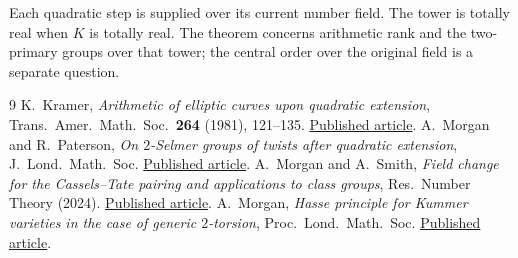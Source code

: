 \documentclass[11pt]{article}
\begin{document}
Each quadratic step is supplied over its current number field.
The tower is totally real when $K$ is totally real. The theorem
concerns arithmetic rank and the two-primary groups over that tower;
the central order over the original field is a separate question.

\begin{thebibliography}{9}
 K.~Kramer, \emph{Arithmetic of elliptic curves upon quadratic
extension}, Trans.\ Amer.\ Math.\ Soc.\ \textbf{264} (1981), 121--135.
\href{https://doi.org/10.1090/S0002-9947-1981-0597871-8}{Published article}.
 A.~Morgan and R.~Paterson, \emph{On $2$-Selmer groups of twists
after quadratic extension}, J.\ Lond.\ Math.\ Soc.
\href{https://doi.org/10.1112/jlms.12533}{Published article}.
 A.~Morgan and A.~Smith, \emph{Field change for the Cassels--Tate
pairing and applications to class groups}, Res.\ Number Theory (2024).
\href{https://doi.org/10.1007/s40993-024-00545-2}{Published article}.
 A.~Morgan, \emph{Hasse principle for Kummer varieties in the
case of generic $2$-torsion}, Proc.\ Lond.\ Math.\ Soc.
\href{https://doi.org/10.1112/plms.70066}{Published article}.
\end{thebibliography}
\end{document}
